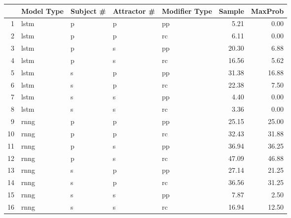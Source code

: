 \begin{tabular}{rllllrr}
  \hline
 & Model Type & Subject \# & Attractor \# & Modifier Type & Sample & MaxProb \\ 
  \hline
1 & lstm & p & p & pp & 5.21 & 0.00 \\ 
  2 & lstm & p & p & rc & 6.11 & 0.00 \\ 
  3 & lstm & p & s & pp & 20.30 & 6.88 \\ 
  4 & lstm & p & s & rc & 16.56 & 5.62 \\ 
  5 & lstm & s & p & pp & 31.38 & 16.88 \\ 
  6 & lstm & s & p & rc & 22.38 & 7.50 \\ 
  7 & lstm & s & s & pp & 4.40 & 0.00 \\ 
  8 & lstm & s & s & rc & 3.36 & 0.00 \\ 
  9 & rnng & p & p & pp & 25.15 & 25.00 \\ 
  10 & rnng & p & p & rc & 32.43 & 31.88 \\ 
  11 & rnng & p & s & pp & 36.94 & 36.25 \\ 
  12 & rnng & p & s & rc & 47.09 & 46.88 \\ 
  13 & rnng & s & p & pp & 27.14 & 21.25 \\ 
  14 & rnng & s & p & rc & 36.56 & 31.25 \\ 
  15 & rnng & s & s & pp & 7.87 & 2.50 \\ 
  16 & rnng & s & s & rc & 16.94 & 12.50 \\ 
   \hline
\end{tabular}
